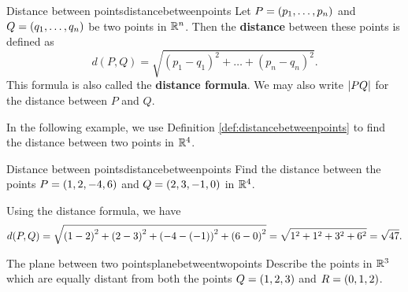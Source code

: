 \begin{definition}{Distance between points}{distancebetweenpoints}
  Let $P=\left(p_{1},\ldots,p_{n}\right)$ and $Q=\left(q_{1},\ldots,q_{n}\right)$ be
  two points in $\mathbb{R}^{n}$. Then the \textbf{distance}
  between these points is defined as
  \begin{equation*}
    d(P, Q) = \sqrt{(p_1-q_1)^2 + \ldots + (p_n-q_n)^2}.
  \end{equation*}
  This formula is also called the \textbf{distance
    formula}. We may also write $\left|PQ\right|$
  for the distance between $P$ and $Q$.
\end{definition}

In the following example, we use Definition
\ref{def:distancebetweenpoints} to find the distance between two
points in $\mathbb{R}^4$.

\begin{example}{Distance between points}{distancebetweenpoints}
  Find the distance between the points $P=\left(1,2,-4,6\right)$ and
  $Q=\left(2,3,-1,0\right)$ in $\mathbb{R}^{4}$.
\end{example}

\begin{solution}
  Using the distance formula, we have
  \begin{equation*}
    d(P,Q)= \sqrt{ \left(1-2\right) ^{2}+\left(2-3\right)
      ^{2}+\left(-4-\left(-1\right) \right) ^{2}+\left(6-0\right)^{2}} =
    \sqrt{1^2+1^2+3^2+6^2} = \sqrt{47}.
  \end{equation*}
\end{solution}

\begin{example}{The plane between two points}{planebetweentwopoints}
  Describe the points in $\mathbb{R}^3$ which are equally distant from both
  the points $Q=\left(1,2,3\right) $ and $R=\left(0,1,2\right)$.
\end{example}

